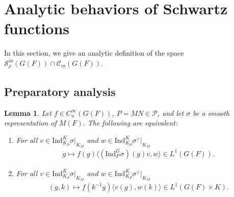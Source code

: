 \documentclass[10pt]{amsart}
\newtheorem{lemma}[theorem]{Lemma}
\theoremstyle{definition}
\numberwithin{equation}{section}
\numberwithin{equation}{subsection}
\newcommand{\Ind}{\mathrm{Ind}}
\begin{document}
\section{Analytic behaviors of Schwartz functions}\label{sec:Schwartz:analytic}

In this section, we give an analytic definition of the space $\mathcal{S}_\rho^{\mathrm{as}}(G(F))\cap \mathcal{C}_{\mathrm{cs}}(G(F)).$

\subsection{Preparatory analysis}\label{ssec:prep}

\begin{lemma}\label{(i):equivalent:key} Let $f\in C^\infty_u(G(F))$, $P=MN\in \mathcal{P}$, and let $\sigma$ be a smooth representation of $M(F).$ The following are equivalent: 
\begin{enumerate}
    \item For all $v\in \Ind_{K_P }^K\sigma\vert_{K_M }$ and $w\in \Ind_{K_P }^K\sigma^\vee\vert_{K_M }$
    \begin{align*}
        g\mapsto f(g)\langle(\Ind_P^G\sigma)(g)v,w\rangle \in L^1(G(F)).
    \end{align*}
    \item For all $v\in \Ind_{K_P }^K\sigma\vert_{K_M }$ and $w\in \Ind_{K_P }^K\sigma^\vee\vert_{K_M }$
    \begin{align*}
        (g,k)\mapsto f(k^{-1}g)\langle v(g),w(k)\rangle \in L^1(G(F)\times K).
    \end{align*}
\end{enumerate}
\end{lemma}
\end{document}
